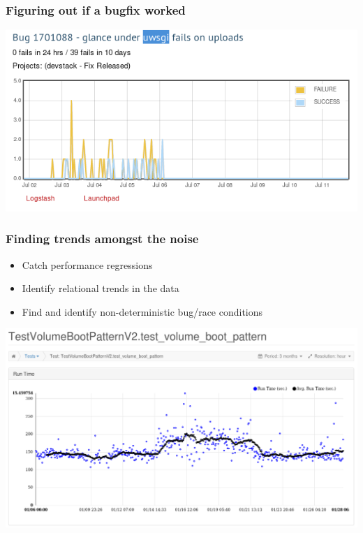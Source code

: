 \documentclass[aspectratio=169,11pt,hyperref={colorlinks=true}]{beamer}
\begin{document}
\begin{frame}
    \frametitle{Figuring out if a bugfix worked}
    \includegraphics[width=\textwidth]{e-r_fixed_bug.png}
\end{frame}

\begin{frame}
    \frametitle{Finding trends amongst the noise}
    \begin{itemize}
        \item Catch performance regressions
        \item Identify relational trends in the data
        \item Find and identify non-deterministic bug/race conditions
    \end{itemize}
    \begin{center}
        \includegraphics[height=.7\textheight]{Performance-Issue-o-h.png}
    \end{center}
\end{frame}
\end{document}
